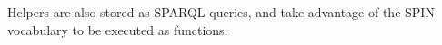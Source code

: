 \documentclass[]{interact}
\theoremstyle{plain}%
\theoremstyle{definition}
\theoremstyle{remark}
\theoremstyle{definition}
\begin{document}
Helpers are also stored as SPARQL queries, and take advantage of the SPIN vocabulary to be executed as functions.
%


%
%
%
\end{document}

